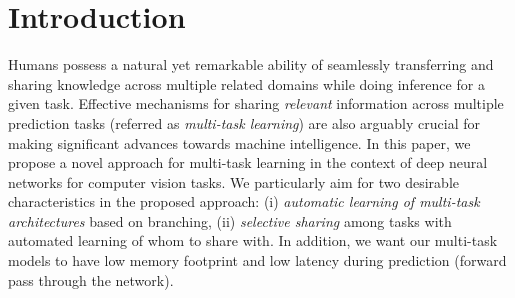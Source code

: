 \documentclass[10pt,twocolumn,letterpaper]{article}
\begin{document}
\vspace{-0.2in}
\section{Introduction}


Humans possess a natural yet remarkable ability of seamlessly transferring and sharing knowledge 
across multiple related domains while doing inference for a given task. Effective mechanisms 
for sharing \emph{relevant} information across multiple prediction tasks (referred as \emph{multi-task learning}) 
are also arguably crucial for making significant advances towards machine intelligence. 
In this paper, we
propose a novel approach for multi-task learning in the context of deep neural networks for computer vision tasks. 
We particularly aim for two desirable characteristics in the proposed approach: 
(i) \emph{automatic learning of multi-task architectures} based on branching,
(ii) \emph{selective sharing} among tasks with automated learning of whom to share with.
In addition, we want our multi-task models to have low memory footprint and low latency during prediction (forward pass through the network). 
\end{document}
